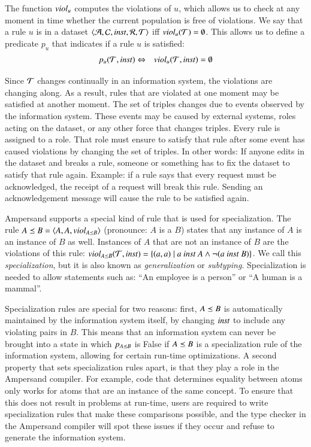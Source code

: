 \documentclass{elsarticle}
\begin{document}
   The function $\text{\it viol\/}_u$ computes the violations of $u$,
   which allows us to check at any moment in time whether the current population is free of violations.
   We say that a rule $u$ is  in a dataset $\langle\mathcal{A},\mathcal{C},\text{\it inst\/},\mathcal{R},\mathcal{T}\rangle$ iff $\text{\it viol\/}_{u}(\mathcal{T})=\emptyset$.
   This allows us to define a predicate $p_u$ that indicates if a rule $u$ is satisfied:
\begin{eqnarray}
   p_u(\mathcal{T},\text{\it inst\/})&\Leftrightarrow&\text{\it viol\/}_{u}(\mathcal{T},\text{\it inst\/})=\emptyset
\end{eqnarray}

   Since $\mathcal{T}$ changes continually in an information system, the violations are changing along.
   As a result, rules that are violated at one moment may be satisfied at another moment.
   The set of triples changes due to events observed by the information system.
   These events may be caused by external systems, roles acting on the dataset, or any other force that changes triples.
   Every rule is assigned to a role.
   That role must ensure to satisfy that rule after some event has caused violations by changing the set of triples.
   In other words: If anyone edits in the dataset and breaks a rule, someone or something has to fix the dataset to satisfy that rule again.
   Example: if a rule says that every request must be acknowledged, the receipt of a request will break this rule.
   Sending an acknowledgement message will cause the rule to be satisfied again.

   Ampersand supports a special kind of rule that is used for specialization.
   The rule $A\preceq B = \langle A, A, viol_{A\preceq B} \rangle$ (pronounce: $A$ is a $B$) states that any instance of $A$ is an instance of $B$ as well.
   Instances of $A$ that are not an instance of $B$ are the violations of this rule: $viol_{A\isa B}(\triples,\inst) = \{(a,a) \mid a\ \inst\ A \wedge \lnot (a\ \inst\ B)\}$.
   We call this {\em specialization}, but it is also known as {\em generalization} or {\em subtyping}.
   Specialization is needed to allow statements such as: ``An employee is a person'' or ``A human is a mammal''.
   
   Specialization rules are special for two reasons:
   first, $A\preceq B$ is automatically maintained by the information system itself, by changing $\text{\it inst\/}$ to include any violating pairs in $B$.
   This means that an information system can never be brought into a state in which $p_{A\preceq B}$ is False if $A\preceq B$ is a specialization rule of the information system, allowing for certain run-time optimizations.
   A second property that sets specialization rules apart, is that they play a role in the Ampersand compiler.
   For example, code that determines equality between atoms only works for atoms that are an instance of the same concept.
   To ensure that this does not result in problems at run-time, users are required to write specialization rules that make these comparisons possible, and the type checker in the Ampersand compiler will spot these issues if they occur and refuse to generate the information system.
\end{document}

